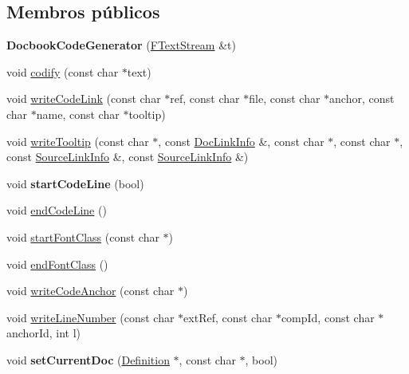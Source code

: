 \subsection*{Membros públicos}
\begin{DoxyCompactItemize}
\item 
\hypertarget{class_docbook_code_generator_a590637fe9cb25b4989d0e5bd1a7001e4}{{\bfseries Docbook\-Code\-Generator} (\hyperlink{class_f_text_stream}{F\-Text\-Stream} \&t)}\label{class_docbook_code_generator_a590637fe9cb25b4989d0e5bd1a7001e4}

\item 
void \hyperlink{class_docbook_code_generator_a96b26b0cb63719fd5370a9a04d2ebb38}{codify} (const char $\ast$text)
\item 
void \hyperlink{class_docbook_code_generator_ab3866da052a840c400b4990dd2ddf61b}{write\-Code\-Link} (const char $\ast$ref, const char $\ast$file, const char $\ast$anchor, const char $\ast$name, const char $\ast$tooltip)
\item 
void \hyperlink{class_docbook_code_generator_a7ff5de02f14ba4c6b98edcaa3483e386}{write\-Tooltip} (const char $\ast$, const \hyperlink{struct_doc_link_info}{Doc\-Link\-Info} \&, const char $\ast$, const char $\ast$, const \hyperlink{struct_source_link_info}{Source\-Link\-Info} \&, const \hyperlink{struct_source_link_info}{Source\-Link\-Info} \&)
\item 
\hypertarget{class_docbook_code_generator_aa76dc2000bd743981f13bb8953b51499}{void {\bfseries start\-Code\-Line} (bool)}\label{class_docbook_code_generator_aa76dc2000bd743981f13bb8953b51499}

\item 
void \hyperlink{class_docbook_code_generator_adbe51a89cf6f9573b3434e7cfda81a7c}{end\-Code\-Line} ()
\item 
void \hyperlink{class_docbook_code_generator_ad907f4c47cf56f8aac603de5537963f0}{start\-Font\-Class} (const char $\ast$)
\item 
void \hyperlink{class_docbook_code_generator_ab7851025d80a6d1ed6dd8e25016136e1}{end\-Font\-Class} ()
\item 
void \hyperlink{class_docbook_code_generator_a688757a1dcb8c6bef1202433a36083a7}{write\-Code\-Anchor} (const char $\ast$)
\item 
void \hyperlink{class_docbook_code_generator_a0a50ef78e830a1b1949dd97491c29c01}{write\-Line\-Number} (const char $\ast$ext\-Ref, const char $\ast$comp\-Id, const char $\ast$anchor\-Id, int l)
\item 
\hypertarget{class_docbook_code_generator_a71a2ac1fad218c1ccb067138cdfaae22}{void {\bfseries set\-Current\-Doc} (\hyperlink{class_definition}{Definition} $\ast$, const char $\ast$, bool)}\label{class_docbook_code_generator_a71a2ac1fad218c1ccb067138cdfaae22}


\end{DoxyCompactItemize}

